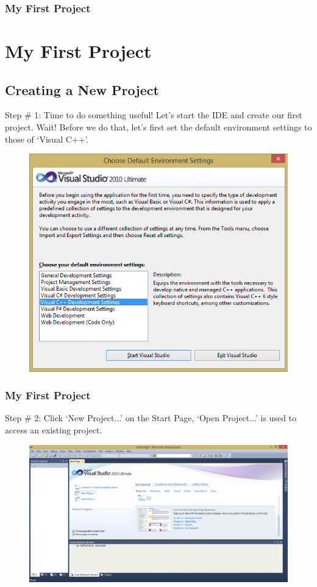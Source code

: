 \documentclass{beamer}
\begin{document}
\begin{frame}
    \frametitle{My First Project}
    \section{My First Project} %
    \label{sec:section_name}
    \subsection{Creating a New Project} %
    \label{sub:subsection_name}
    Step \# 1: Time to do something useful! Let's start the IDE and create our first project. Wait! Before we do that, let's first set the default environment settings to those of `Visual C++'.
    \begin{figure}
        \centering
        \includegraphics[scale=0.35]{step_7}
    \end{figure}
\end{frame}

\begin{frame}
    \frametitle{My First Project}
    Step \# 2: Click `New Project...' on the Start Page, `Open Project...' is used to access an existing project.
    \begin{figure}
        \centering
        \includegraphics[scale=0.33]{step_8}
    \end{figure}
\end{frame}
\end{document}

